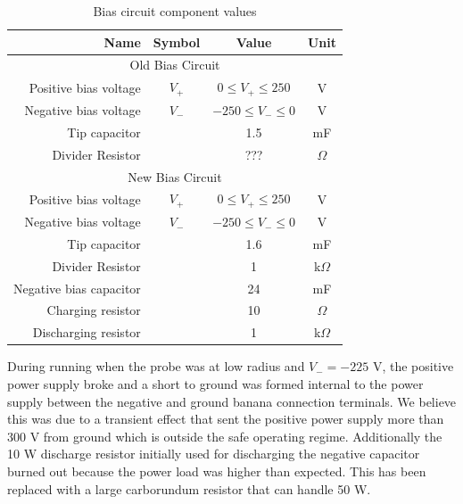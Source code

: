 \begin{table}
    \begin{center}
        \begin{tabular}{|r|c|c|c|}
            \hline
            Name & Symbol & Value & Unit \\
            \hline\hline
            \multicolumn{4}{|c|}{Old Bias Circuit} \\
            \hline
            Positive bias voltage & $V_+$ & $0 \leq V_+ \leq 250$ & V \\
            \hline
            Negative bias voltage & $V_-$ & $-250 \leq V_- \leq 0$ & V \\
            \hline
            Tip capacitor & & 1.5 & mF \\
            \hline
            Divider Resistor & & ??? & $\Omega$ \\
            \hline\hline
            \multicolumn{4}{|c|}{New Bias Circuit} \\
            \hline
            Positive bias voltage & $V_+$ & $0 \leq V_+ \leq 250$ & V \\
            \hline
            Negative bias voltage & $V_-$ & $-250 \leq V_- \leq 0$ & V \\
            \hline
            Tip capacitor & & 1.6 & mF \\
            \hline
            Divider Resistor & & 1 & k$\Omega$ \\
            \hline
            Negative bias capacitor & & 24 & mF \\
            \hline
            Charging resistor & & 10 & $\Omega$ \\
            \hline
            Discharging resistor & & 1 & k$\Omega$ \\
            \hline
        \end{tabular}
    \end{center}
    \caption[*Multi-tip Bias Circuit Component Values]{Bias circuit component values}
\end{table}

During running when the probe was at low radius and $V_- = -225$ V, the positive power supply broke and a short to ground was formed internal to the power supply between the negative and ground banana connection terminals. We believe this was due to a transient effect that sent the positive power supply more than 300 V from ground which is outside the safe operating regime. Additionally the 10 W discharge resistor initially used for discharging the negative capacitor burned out because the power load was higher than expected. This has been replaced with a large carborundum resistor that can handle 50 W.

